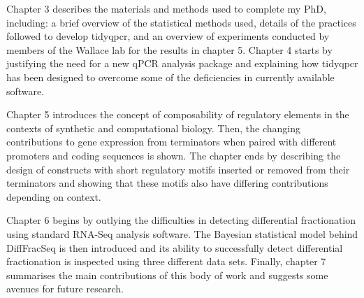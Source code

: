\documentclass[../main.tex]{subfiles}
\begin{document}
Chapter 3 describes the materials and methods used to complete my PhD, including: a brief overview of the statistical methods used, details of the practices followed to develop tidyqpcr, and an overview of experiments conducted by members of the Wallace lab for the results in chapter 5. 
Chapter 4 starts by justifying the need for a new qPCR analysis package and explaining how tidyqpcr has been designed to overcome some of the deficiencies in currently available software.

Chapter 5 introduces the concept of composability of regulatory elements in the contexts of synthetic and computational biology.
Then, the changing contributions to gene expression from terminators when paired with different promoters and coding sequences is shown.
The chapter ends by describing the design of constructs with short regulatory motifs inserted or removed from their terminators and showing that these motifs also have differing contributions depending on context.

Chapter 6 begins by outlying the difficulties in detecting differential fractionation using standard RNA-Seq analysis software.
The Bayesian statistical model behind DiffFracSeq is then introduced and its ability to successfully detect differential fractionation is inspected using three different data sets.
Finally, chapter 7 summarises the main contributions of this body of work and suggests some avenues for future research. 

\newpage
\end{document}
